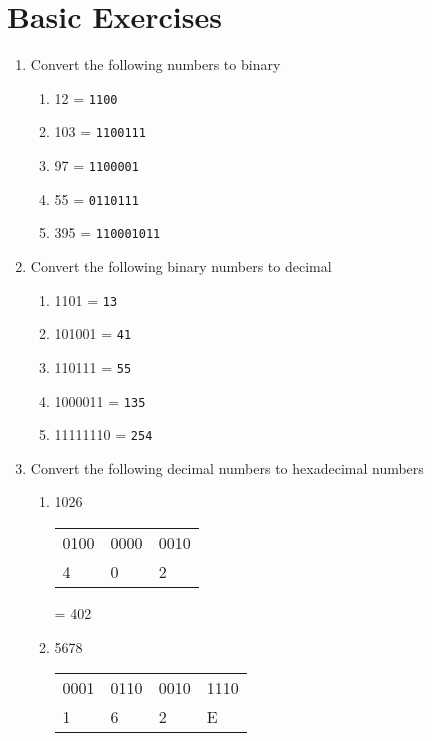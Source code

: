 
\section*{Basic Exercises}
\begin{enumerate}
    \item Convert the following numbers to binary
    \begin{enumerate}
        \item 12 = \verb|1100|
        \item 103 = \verb|1100111|
        \item 97 = \verb|1100001|
        \item 55 = \verb|0110111|
        \item 395 = \verb|110001011|
    \end{enumerate}
    \item Convert the following binary numbers to decimal
    \begin{enumerate}
        \item 1101 = \verb|13|
        \item 101001 = \verb|41|
        \item 110111 = \verb|55|
        \item 1000011 = \verb|135|
        \item 11111110 = \verb|254|
    \end{enumerate}
    \item Convert the following decimal numbers to hexadecimal numbers
    \begin{enumerate}
        \item 1026
        \begin{table}[H]
            \hspace*{4em}\begin{tabularx}{0.4\textwidth}{XXX}
                0100 & 0000 & 0010 \\
                4 & 0 & 2
            \end{tabularx}
        \end{table}
        = 402
        \item 5678
        \begin{table}[H]
            \hspace*{4em}\begin{tabularx}{0.4\textwidth}{XXXX}
                0001 & 0110 & 0010 & 1110 \\
                1 & 6 & 2 & E
            \end{tabularx}

\end{table}
\end{enumerate}
\end{enumerate}
